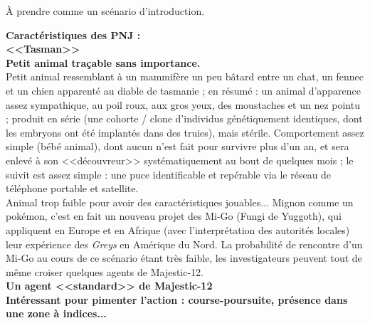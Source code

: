 \documentclass[11pt,twoside,a4paper]{article}
\begin{document}
	{\`A} prendre comme un sc{\'e}nario d'introduction. ~\\

\clearpage

\begin{multicols}{2}

\textbf{\huge Caract{\'e}ristiques des PNJ : }~\\

	\textbf{\Large <<Tasman>>}~\\
	\textbf{Petit animal tra\c{c}able sans importance. }~\\
	Petit animal ressemblant {\`a} un mammif{\`e}re un peu b{\^a}tard entre un chat, un fennec et un chien apparent{\'e} au diable de tasmanie ; en r{\'e}sum{\'e} : un animal d'apparence assez sympathique, au poil roux, aux gros yeux, des moustaches et un nez pointu ; produit en s{\'e}rie (une cohorte / clone d'individus g{\'e}n{\'e}tiquement identiques, dont les embryons ont {\'e}t{\'e} implant{\'e}s dans des truies), mais st{\'e}rile. Comportement assez simple (b{\'e}b{\'e} animal), dont aucun n'est fait pour survivre plus d'un an, et sera enlev{\'e} {\`a} son <<d{\'e}couvreur>> syst{\'e}matiquement au bout de quelques mois ; le suivit est assez simple : une puce identificable et rep{\'e}rable via le r{\'e}seau de t{\'e}l{\'e}phone portable et satellite. ~\\

	Animal trop faible pour avoir des caract{\'e}ristiques jouables... Mignon comme un pok{\'e}mon, c'est en fait un nouveau projet des Mi-Go (Fungi de Yuggoth), qui appliquent en Europe et en Afrique (avec l'interpr{\'e}tation des autorit{\'e}s locales) leur exp{\'e}rience des \emph{Greys} en Am{\'e}rique du Nord. La probabilit{\'e} de rencontre d'un Mi-Go au cours de ce sc{\'e}nario {\'e}tant tr{\`e}s faible, les investigateurs peuvent tout de m{\^e}me croiser quelques agents de Majestic-12. ~\\


	\textbf{\large Un agent <<standard>> de Majestic-12}~\\
	\textbf{Int{\'e}ressant pour pimenter l'action : course-poursuite, pr{\'e}sence dans une zone {\`a} indices...} ~\\
	

\end{multicols}
\end{document}

